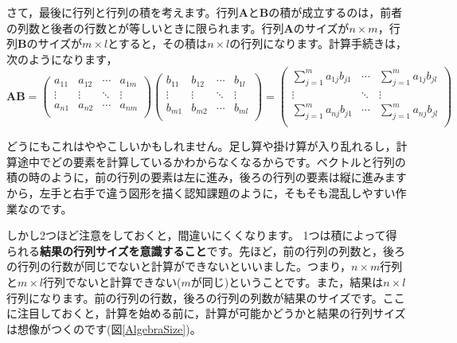 \documentclass{ltjsbook}
\begin{document}
さて，最後に行列と行列の積を考えます。行列$\bm{A}$と$\bm{B}$の積が成立するのは，前者の列数と後者の行数とが等しいときに限られます。行列$\bm{A}$のサイズが$n \times m$，行列$\bm{B}$のサイズが$m \times l$とすると，その積は$n \times l$の行列になります。計算手続きは，次のようになります，
\begin{equation*}
	\bm{A} \bm{B} =
	\begin{pmatrix}
		a_{11} & a_{12} & \cdots & a_{1m} \\
		\vdots & \vdots & \ddots & \vdots \\
		a_{n1} & a_{n2} & \cdots & a_{nm} \\
	\end{pmatrix}
	\begin{pmatrix}
		b_{11} & b_{12} & \cdots & b_{1l} \\
		\vdots & \vdots & \ddots & \vdots \\
		b_{m1} & b_{m2} & \cdots & b_{ml} \\
	\end{pmatrix}
	=
	\begin{pmatrix}
		\sum_{j=1}^{m} a_{1j} b_{j1} & \cdots & \sum_{j=1}^{m} a_{1j} b_{jl} \\
		\vdots                       & \ddots & \vdots                       \\
		\sum_{j=1}^{m} a_{nj} b_{j1} & \cdots & \sum_{j=1}^{m} a_{nj} b_{jl} \\
	\end{pmatrix}
\end{equation*}


どうにもこれはややこしいかもしれません。足し算や掛け算が入り乱れるし，計算途中でどの要素を計算しているかわからなくなるからです。ベクトルと行列の積の時のように，前の行列の要素は左に進み，後ろの行列の要素は縦に進みますから，左手と右手で違う図形を描く認知課題のように，そもそも混乱しやすい作業なのです。

しかし2つほど注意をしておくと，間違いにくくなります。
1つは積によって得られる\textbf{結果の行列サイズを意識すること}です。先ほど，前の行列の列数と，後ろの行列の行数が同じでないと計算ができないといいました。つまり，$n \times m$行列と$m \times l$行列でないと計算できない($m$が同じ)ということです。また，結果は$n \times l$行列になります。前の行列の行数，後ろの行列の列数が結果のサイズです。ここに注目しておくと，計算を始める前に，計算が可能かどうかと結果の行列サイズは想像がつくのです(図\ref{AlgebraSize})。
\end{document}
